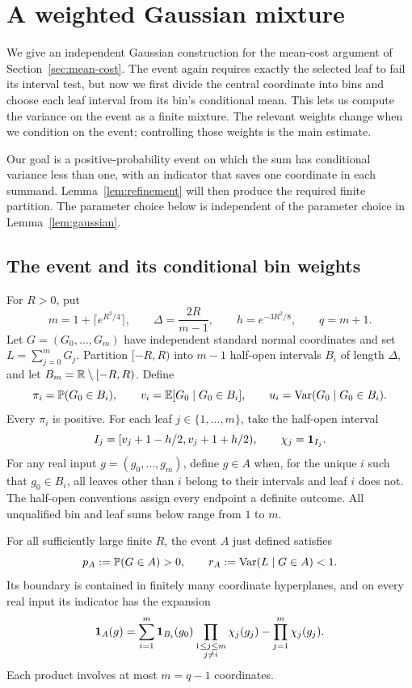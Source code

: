 \section{A weighted Gaussian mixture}
\label{app:weighted-mixture}

We give an independent Gaussian construction for the mean-cost
argument of Section~\ref{sec:mean-cost}. The event again requires
exactly the selected leaf to fail its interval test, but now we first
divide the central coordinate into bins and choose each leaf interval
from its bin's conditional mean. This lets us compute the variance on
the event as a finite mixture. The relevant weights change when we
condition on the event; controlling those weights is the main estimate.

Our goal is a positive-probability event on which the sum has
conditional variance less than one, with an indicator that saves one
coordinate in each summand. Lemma~\ref{lem:refinement} will then
produce the required finite partition. The parameter choice below is
independent of the parameter choice in Lemma~\ref{lem:gaussian}.

\subsection{The event and its conditional bin weights}
\label{app:weighted-identity}

For $R>0$, put
\begin{equation}\label{app:weighted-schedule}
 m=1+\lceil e^{R^2/4}\rceil,\qquad
 \Delta=\frac{2R}{m-1},\qquad h=e^{-3R^2/8},\qquad q=m+1.
\end{equation}
Let $G=(G_0,\ldots,G_m)$ have independent standard normal coordinates
and set $L=\sum_{j=0}^mG_j$. Partition $[-R,R)$ into $m-1$ half-open
intervals $B_i$ of length $\Delta$, and let
$B_m=\mathbb R\setminus[-R,R)$. Define
\[
 \pi_i=\mathbb P(G_0\in B_i),\qquad
 v_i=\mathbb E[G_0\mid G_0\in B_i],\qquad
 u_i=\operatorname{Var}(G_0\mid G_0\in B_i).
\]
Every $\pi_i$ is positive. For each leaf $j\in\{1,\ldots,m\}$,
take the half-open interval
\[
 I_j=[v_j+1-h/2,v_j+1+h/2),\qquad \chi_j=\mathbf 1_{I_j}.
\]
For any real input $g=(g_0,\ldots,g_m)$, define $g\in A$ when,
for the unique $i$ such that $g_0\in B_i$, all leaves other than $i$
belong to their intervals and leaf $i$ does not. The half-open
conventions assign every endpoint a definite outcome.
All unqualified bin and leaf sums below range from $1$ to $m$.

\begin{lemma}\label{lem:weighted-event}
For all sufficiently large finite $R$, the event $A$ just defined
satisfies
\[
 p_A:=\mathbb P(G\in A)>0,\qquad r_A:=\operatorname{Var}(L\mid G\in A)<1.
\]
Its boundary is contained in finitely many coordinate hyperplanes,
and on every real input its indicator has the expansion
\begin{equation}\label{app:weighted-cell}
 \mathbf 1_A(g)=
 \sum_{i=1}^m\mathbf 1_{B_i}(g_0)
       \prod_{\substack{1\le j\le m\\j\ne i}}\chi_j(g_j)
       -\prod_{j=1}^m\chi_j(g_j).
\end{equation}
Each product involves at most $m=q-1$ coordinates.
\end{lemma}

